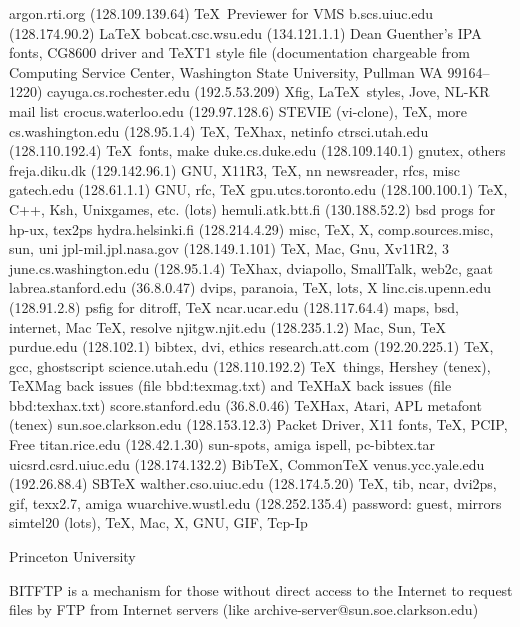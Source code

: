 {\tx argon.rti.org} (128.109.139.64) \TeX\ Previewer for VMS\nl
{\tx b.scs.uiuc.edu} (128.174.90.2) \LaTeX\nl
{\tx bobcat.csc.wsu.edu} (134.121.1.1) Dean Guenther's IPA fonts,
     CG8600 driver and \TeX T1 style file (documentation chargeable from
     Computing Service Center, Washington State University, Pullman WA
     99164--1220)\nl
{\tx cayuga.cs.rochester.edu} (192.5.53.209) Xfig, \LaTeX\ styles, Jove,
     NL-KR mail list\nl
{\tx crocus.waterloo.edu} (129.97.128.6) STEVIE (vi-clone), \TeX, more\nl
{\tx cs.washington.edu} (128.95.1.4) \TeX, \TeX hax, netinfo\nl
{\tx ctrsci.utah.edu} (128.110.192.4) \TeX\ fonts, make\nl
{\tx duke.cs.duke.edu} (128.109.140.1) gnutex, others\nl
{\tx freja.diku.dk} (129.142.96.1) GNU, X11R3, \TeX, nn newsreader, rfcs,
     misc\nl
{\tx gatech.edu} (128.61.1.1) GNU, rfc, \TeX\nl
{\tx gpu.utcs.toronto.edu} (128.100.100.1) \TeX, C++, Ksh, Unixgames,
     etc. (lots)\nl
{\tx hemuli.atk.btt.fi} (130.188.52.2) bsd progs for hp-ux, tex2ps\nl
{\tx hydra.helsinki.fi} (128.214.4.29) misc, \TeX, X, comp.sources.misc,
     sun, uni\nl
{\tx jpl-mil.jpl.nasa.gov} (128.149.1.101) \TeX, Mac, Gnu, Xv11R{2, 3}\nl
{\tx june.cs.washington.edu} (128.95.1.4) \TeX hax, dviapollo, SmallTalk,
     web2c, gaat\nl
{\tx labrea.stanford.edu} (36.8.0.47) dvips, paranoia, \TeX, lots, X\nl
{\tx linc.cis.upenn.edu} (128.91.2.8) psfig for ditroff, \TeX\nl
{\tx ncar.ucar.edu} (128.117.64.4) maps, bsd, internet, Mac \TeX,
     resolve\nl
{\tx njitgw.njit.edu} (128.235.1.2) Mac, Sun, \TeX\nl
{\tx purdue.edu} (128.102.1) bibtex, dvi, ethics\nl
{\tx research.att.com} (192.20.225.1) \TeX, gcc, ghostscript\nl
{\tx science.utah.edu} (128.110.192.2) \TeX\ things, Hershey (tenex),
     \TeX Mag back issues (file {\tx bbd:texmag.txt}) and \TeX HaX back
     issues (file {\tx bbd:texhax.txt})\nl
{\tx score.stanford.edu} (36.8.0.46) \TeX Hax, Atari, APL metafont
     (tenex)\nl
{\tx sun.soe.clarkson.edu} (128.153.12.3) Packet Driver, X11 fonts, \TeX,
     PCIP, Free\nl
{\tx titan.rice.edu} (128.42.1.30) sun-spots, amiga ispell,
     pc-bibtex.tar\nl
{\tx uicsrd.csrd.uiuc.edu} (128.174.132.2) BibTeX, CommonTeX\nl
{\tx venus.ycc.yale.edu} (192.26.88.4) SBTeX\nl
{\tx walther.cso.uiuc.edu} (128.174.5.20) \TeX, tib, ncar, dvi2ps, gif,
     texx2.7, amiga\nl
{\tx wuarchive.wustl.edu} (128.252.135.4) password: guest, mirrors
     simtel20 (lots), \TeX, Mac, X, GNU, GIF, Tcp-Ip

 {Princeton University}

     BITFTP is a mechanism for those without direct access to the
     Internet to request files by FTP from Internet servers (like {\tx
     archive-server@sun.soe.clarkson.edu})

